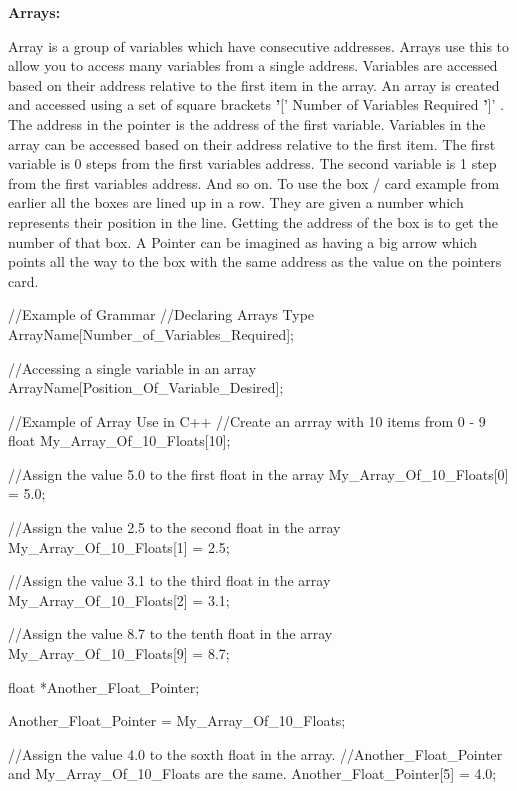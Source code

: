  {\bfseries Arrays:} \par
 Array is a group of variables which have consecutive addresses. Arrays use this to allow you to access many variables from a single address. Variables are accessed based on their address relative to the first item in the array. An array is created and accessed using a set of square brackets {\bfseries '}\mbox{[}' Number of Variables Required {\bfseries '}\mbox{]}' . The address in the pointer is the address of the first variable. Variables in the array can be accessed based on their address relative to the first item. The first variable is 0 steps from the first variables address. The second variable is 1 step from the first variables address. And so on. To use the box / card example from earlier all the boxes are lined up in a row. They are given a number which represents their position in the line. Getting the address of the box is to get the number of that box. A Pointer can be imagined as having a big arrow which points all the way to the box with the same address as the value on the pointers card. 
\begin{DoxyCode}
 //Example of Grammar
 //Declaring Arrays
 Type ArrayName[Number_of_Variables_Required];

 //Accessing a single variable in an array
 ArrayName[Position_Of_Variable_Desired];
\end{DoxyCode}
 
\begin{DoxyCode}
 //Example of Array Use in C++
 //Create an arrray with 10 items from 0 - 9
 float My_Array_Of_10_Floats[10];

 //Assign the value 5.0 to the first float in the array
 My_Array_Of_10_Floats[0] = 5.0;

 //Assign the value 2.5 to the second float in the array
 My_Array_Of_10_Floats[1] = 2.5;

 //Assign the value 3.1 to the third float in the array
 My_Array_Of_10_Floats[2] = 3.1;

 //Assign the value 8.7 to the tenth float in the array
 My_Array_Of_10_Floats[9] = 8.7;

 float *Another_Float_Pointer;

 Another_Float_Pointer = My_Array_Of_10_Floats;

 //Assign the value 4.0 to the soxth float in the array.
 //Another_Float_Pointer and My_Array_Of_10_Floats are the same.
 Another_Float_Pointer[5] = 4.0;
\end{DoxyCode}



